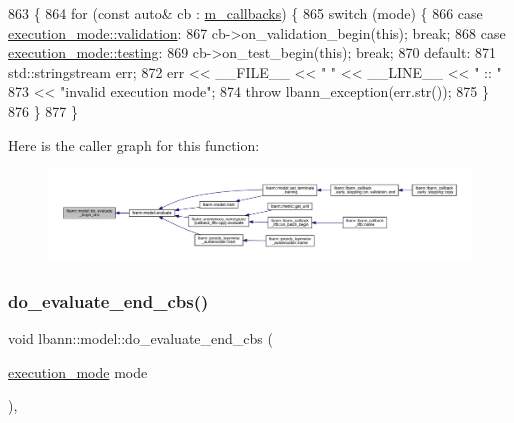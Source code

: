 \begin{DoxyCode}
863                                                      \{
864   \textcolor{keywordflow}{for} (\textcolor{keyword}{const} \textcolor{keyword}{auto}& cb : \hyperlink{classlbann_1_1model_a07b511fef30368494c2ad80922ffd0eb}{m\_callbacks}) \{
865     \textcolor{keywordflow}{switch} (mode) \{
866     \textcolor{keywordflow}{case} \hyperlink{base_8hpp_a2781a159088df64ed7d47cc91c4dc0a8aa617908b172c473cb8e8cda059e55bf0}{execution\_mode::validation}:
867       cb->on\_validation\_begin(\textcolor{keyword}{this}); \textcolor{keywordflow}{break};
868     \textcolor{keywordflow}{case} \hyperlink{base_8hpp_a2781a159088df64ed7d47cc91c4dc0a8aae2b1fca515949e5d54fb22b8ed95575}{execution\_mode::testing}:
869       cb->on\_test\_begin(\textcolor{keyword}{this}); \textcolor{keywordflow}{break};
870     \textcolor{keywordflow}{default}:
871       std::stringstream err;
872       err << \_\_FILE\_\_ << \textcolor{stringliteral}{" "} << \_\_LINE\_\_ << \textcolor{stringliteral}{" :: "}
873           << \textcolor{stringliteral}{"invalid execution mode"};
874       \textcolor{keywordflow}{throw} lbann\_exception(err.str());
875     \}
876   \}
877 \}
\end{DoxyCode}
Here is the caller graph for this function\+:\nopagebreak
\begin{figure}[H]
\begin{center}
\leavevmode
\includegraphics[width=350pt]{classlbann_1_1model_ab14bedea05bd5ef549d95ceb2b57b7a4_icgraph}
\end{center}
\end{figure}
\mbox{\label{classlbann_1_1model_ab123ed691fb6e9f52d468914a1f4460c}} 
\subsubsection{\texorpdfstring{do\+\_\+evaluate\+\_\+end\+\_\+cbs()}{do\_evaluate\_end\_cbs()}}
{\footnotesize\ttfamily void lbann\+::model\+::do\+\_\+evaluate\+\_\+end\+\_\+cbs (\begin{DoxyParamCaption}\item[{\hyperlink{base_8hpp_a2781a159088df64ed7d47cc91c4dc0a8}{execution\+\_\+mode}}]{mode }\end{DoxyParamCaption})\hspace{0.3cm}{\ttfamily [protected]}, {\ttfamily [virtual]}}

